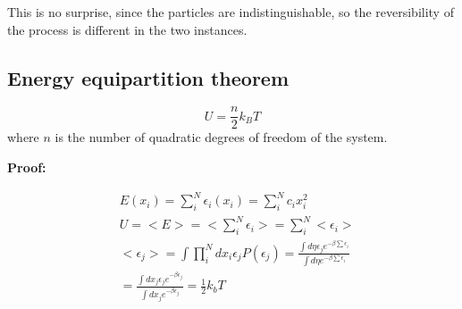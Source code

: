 \documentclass{article}
\begin{document}
This is no surprise, since the particles are indistinguishable, so the reversibility of the process is different in the two instances.


\subsection{Energy equipartition theorem}

\begin{tcolorbox}[colframe=gray!50, colback=gray!10, coltitle=black, title=Energy Equipartition Theorem]

    \begin{equation}
        U=\frac{n}{2}k_BT
    \end{equation}
    where \( n \) is the number of quadratic degrees of freedom of the system.

\end{tcolorbox}

\textbf{Proof:}

\begin{equation}
    \begin{aligned}
         & E({x_i})=\sum_{i}^{N}\epsilon_i(x_i)=\sum_{i}^{N}c_ix_i^2                                                                                                 \\
         & U=<E>=<\sum_{i}^{N}\epsilon_i>=\sum_{i}^{N}<\epsilon_i>                                                                                                   \\
         & <\epsilon_j>=\int \prod_{i}^{N}dx_i\epsilon_jP(\epsilon_j)= \frac{\int d\eta \epsilon_je^{-\beta \sum \epsilon_i}}{\int d\eta e^{-\beta \sum \epsilon_i}} \\
         & = \frac{\int dx_j\epsilon_je^{-\beta \epsilon_j}}{\int dx_je^{-\beta \epsilon_j}}=\frac{1}{2}k_bT
    \end{aligned}
\end{equation}

\newpage
\end{document}
